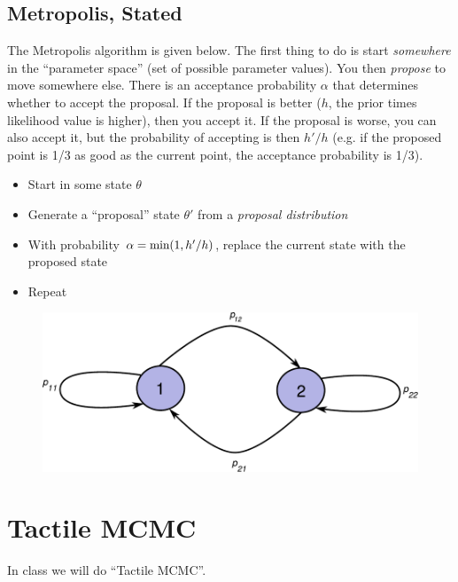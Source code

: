 \subsection{Metropolis, Stated}
The Metropolis algorithm is given below. The first thing to do is start
{\it somewhere} in the ``parameter space'' (set of possible parameter values).
You then
{\it propose} to move somewhere else. There is an acceptance probability $\alpha$
that determines whether to accept the proposal. If the proposal is better
($h$, the prior times likelihood value is higher), then you accept it. If the
proposal is worse, you can also accept it, but the probability of accepting is
then $h'/h$ (e.g. if the proposed point is 1/3 as good as the current point, the
acceptance probability is 1/3).

\begin{framed}
\begin{itemize}
\item Start in some state $\theta$
\item Generate a ``proposal'' state $\theta'$ from a {\it proposal distribution}
\item With probability $\alpha = \textnormal{min}(1, h'/h)$, replace the current
state with the proposed state
\item Repeat
\end{itemize}
\end{framed}

\begin{figure}[ht!]
\begin{center}
\includegraphics[scale=0.65]{Figures/transitions.pdf}
\caption{\label{fig:transitions}}
\end{center}
\end{figure}



\section{Tactile MCMC}
In class we will do ``Tactile MCMC''.
